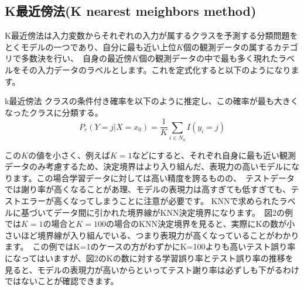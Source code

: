 \documentclass[uplatex]{jsarticle}
\begin{document}
\subsection{K最近傍法(K nearest meighbors method)}
K最近傍法は入力変数からそれぞれの入力が属するクラスを予測する分類問題をとくモデルの一つであり、自分に最も近い上位$K$個の観測データの属するカテゴリで多数決を行い、\
自身の最近傍$K$個の観測データの中で最も多く現れたラベルをその入力データのラベルとします。これを定式化すると以下のようになります。
\begin{itembox}[l]{k最近傍法}
  クラスの条件付き確率を以下のように推定し、この確率が最も大きくなったクラスに分類する。
    $$P_r(Y = j|X = x_0) = \frac{1}{K}\sum_{i \in N_0} I(y_i = j)$$
\end{itembox}
この$K$の値を小さく、例えば$K = 1$などにすると、それぞれ自身に最も近い観測データのみ考慮するため、決定境界はより入り組んだ、表現力の高いモデルになります。この場合学習データに対しては高い精度を誇るものの、\
テストデータでは謝り率が高くなることがあ理、モデルの表現力は高すぎても低すぎても、テストエラーが高くなってしまうことに注意が必要です。
KNNで求められたラベルに基づいてデータ間に引かれた境界線がKNN決定境界になります。\
図2の例では$K=1の場合とK=100$の場合のKNN決定境界を見ると、実際にKの数が小さいほど境界線が入り組んでいる、つまり表現力が高くなっていることがわかります。\
この例ではK=1のケースの方がわずかにK=100よりも高いテスト誤り率になってはいますが、図2のKの数に対する学習誤り率とテスト誤り率の推移を見ると、モデルの表現力が高いからといってテスト謝り率は必ずしも下がるわけではないことが確認できます。\
\end{document}
